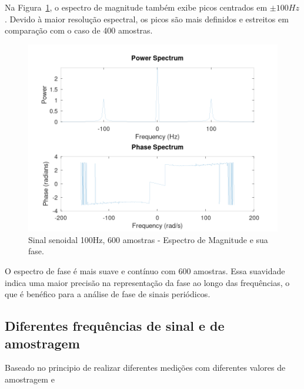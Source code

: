 Na Figura~\ref{fig:spec-signal-100-600}, o espectro de magnitude também exibe picos centrados em $\pm100Hz$. Devido à maior resolução espectral, os picos são mais definidos e estreitos em comparação com o caso de 400 amostras. %

\begin{figure}[H]
    \centering
    \includegraphics[width=1\linewidth]{03_results/assets/sin__100Hz_fs2k_SPECTRUM_600smp.png}
    \caption{Sinal senoidal 100Hz, 600 amostras - Espectro de Magnitude e sua fase.}
    \label{fig:spec-signal-100-600}
\end{figure}

O espectro de fase é mais suave e contínuo com 600 amostras. Essa suavidade indica uma maior precisão na representação da fase ao longo das frequências, o que é benéfico para a análise de fase de sinais periódicos.

\subsection{Diferentes frequências de sinal e de amostragem}
Baseado no principio de realizar diferentes medições com diferentes valores de amostragem e 


